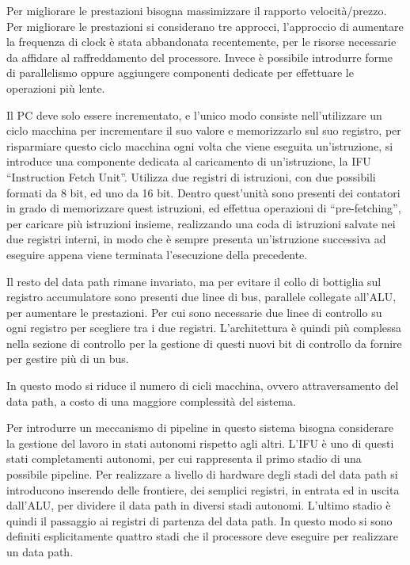 \documentclass{article}
\numberwithin{equation}{subsection}
\begin{document}
Per migliorare le prestazioni bisogna massimizzare il rapporto velocità/prezzo. Per migliorare le prestazioni si considerano tre approcci, l'approccio di aumentare la frequenza 
di clock è stata abbandonata recentemente, per le risorse necessarie da affidare al raffreddamento del processore. Invece è possibile introdurre forme di parallelismo oppure 
aggiungere componenti dedicate per effettuare le operazioni più lente. 


Il PC deve solo essere incrementato, e l'unico modo consiste nell'utilizzare un ciclo macchina per incrementare il suo valore e memorizzarlo sul suo registro, per risparmiare 
questo ciclo macchina ogni volta che viene eseguita un'istruzione, si introduce una componente dedicata al caricamento di un'istruzione, la IFU ``Instruction Fetch Unit''. 
Utilizza due registri di istruzioni, con due possibili formati da 8 bit, ed uno da 16 bit. Dentro quest'unità sono presenti dei contatori in grado di memorizzare quest istruzioni, 
ed effettua operazioni di ``pre-fetching'', per caricare più istruzioni insieme, realizzando una coda di istruzioni salvate nei due registri interni, in modo che è sempre 
presenta un'istruzione successiva ad eseguire appena viene terminata l'esecuzione della precedente. 


Il resto del data path rimane invariato, ma per evitare il collo di bottiglia sul registro accumulatore sono presenti due linee di bus, parallele collegate all'ALU, per 
aumentare le prestazioni. Per cui sono necessarie due linee di controllo su ogni registro per scegliere tra i due registri. L'architettura è quindi più complessa nella sezione 
di controllo per la gestione di questi nuovi bit di controllo da fornire per gestire più di un bus. 


In questo modo si riduce il numero di cicli macchina, ovvero attraversamento del data path, a costo di una maggiore complessità del sistema. 

Per introdurre un meccanismo di pipeline in questo sistema bisogna considerare la gestione del lavoro in stati autonomi rispetto agli altri. L'IFU è uno di questi stati 
completamenti autonomi, per cui rappresenta il primo stadio di una possibile pipeline. Per realizzare a livello di hardware degli stadi del data path si introducono inserendo 
delle frontiere, dei semplici registri, in entrata ed in uscita dall'ALU, per dividere il data path in diversi stadi autonomi. L'ultimo stadio è quindi il passaggio ai registri 
di partenza del data path. In questo modo si sono definiti esplicitamente quattro stadi che il processore deve eseguire per realizzare un data path. 
\end{document}
